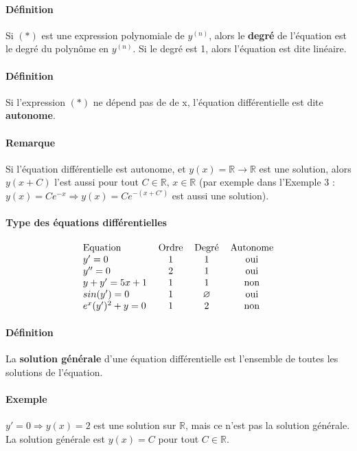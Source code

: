 \documentclass[1Opt]{report}
\begin{document}
\paragraph{Définition}
Si $(\ast)$ est une expression polynomiale de $y^{(n)}$, alors le \textbf{degré} de
l'équation est le degré du polynôme en $y^{(n)}$. Si le degré est 1, alors
l'équation est dite linéaire.

\paragraph{Définition}
Si l'expression $(\ast)$ ne dépend pas de de x, l'équation différentielle est
dite \textbf{autonome}.

\paragraph{Remarque}
Si l'équation différentielle est autonome, et
$y(x)={\mathbb R}\rightarrow{\mathbb R}$ est une solution, alors $y(x+C)$ l'est
aussi pour tout $C\in{\mathbb R},\,x\in{\mathbb R}$ (par exemple dans l'Exemple
3 : $y(x)=Ce^{-x}\Rightarrow y(x)=Ce^{-(x+C')}$ est aussi une solution).

\paragraph{Type des équations différentielles}
\begin{eqnarray*}
  \begin{tabular}{l c c c}
    Equation & Ordre & Degré & Autonome \\
    $y'=0$ & 1 & 1 & oui \\
    $y''=0$ & 2 & 1 & oui \\
    $y+y'=5x+1$ & 1 & 1 & non \\
    $sin(y')=0$ & 1 & $\varnothing$ & oui \\
    $e^x(y')^2+y=0$ & 1 & 2 & non
  \end{tabular}
\end{eqnarray*}

\paragraph{Définition}
La \textbf{solution générale} d'une équation différentielle est l'ensemble de
toutes les solutions de l'équation.

\paragraph{Exemple}
$y'=0\Rightarrow y(x)=2$ est une solution sur ${\mathbb R}$, mais ce n'est pas
la solution générale. La solution générale est $y(x)=C$ pour tout
$C\in{\mathbb R}$.
\end{document}
